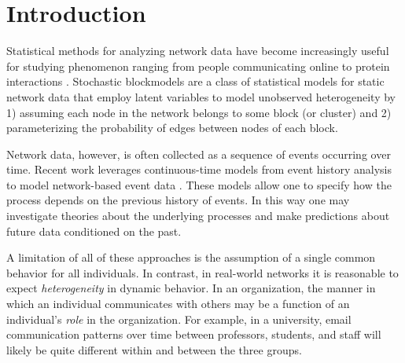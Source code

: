 \section{Introduction}

Statistical methods for analyzing network data have become increasingly useful for studying  phenomenon ranging from people communicating online to protein interactions \cite{Goldenberg2009}.
Stochastic blockmodels \cite{Nowicki2001, Kemp, Ishiguro2010} are a class of statistical models for static network data that employ latent variables to model unobserved heterogeneity by 1) assuming each node in the network belongs to some block (or cluster) and 2) parameterizing the probability of edges between nodes of each block.  %

Network data, however, is often collected as a sequence of events occurring over time.
Recent work leverages  continuous-time models from event history analysis  \cite{AalenOddO.2008} to model network-based event data \cite{Butts2008,Brandes2009,Perry2011,Stadtfeld2010,Stadtfeld2011,Opsahl2011,Vu2011,Vu2011a}.
These models allow one to specify how the process depends on the previous history of events.
In this way one may investigate theories about the underlying processes and make predictions about future data conditioned on the past.

A limitation of all of these approaches is the assumption of a single common behavior for all individuals.
In contrast, in real-world networks it is reasonable to expect {\it heterogeneity} in dynamic behavior.  
In an organization, the manner in which an individual communicates with others may be a function of an individual's {\it role} in the organization.
For example, in a university,  email communication patterns over time between professors, students, and staff will likely be quite different within and between the three groups.

%

